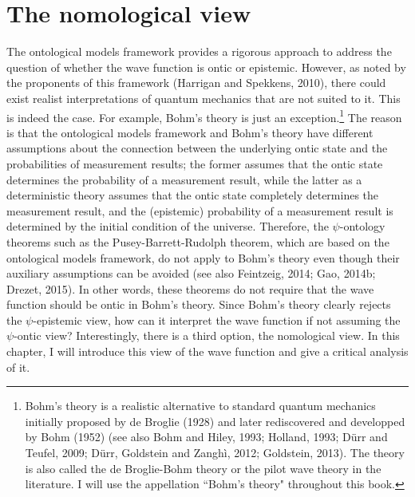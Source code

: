 \chapter{The nomological view}

The ontological models framework provides a rigorous approach to address the question of whether the wave function is ontic or epistemic. 
However, as noted by the proponents of this framework (Harrigan and Spekkens, 2010), there could exist realist interpretations of quantum mechanics that are not suited to it. This is indeed the case. For example, Bohm's theory is just an exception.\footnote{Bohm's theory is a realistic alternative to standard quantum mechanics initially proposed by de Broglie (1928) and later rediscovered and developped by Bohm (1952) (see also Bohm and Hiley, 1993; Holland, 1993; D\"{u}rr and Teufel, 2009; D\"{u}rr, Goldstein and Zangh\`{i}, 2012; Goldstein, 2013).  The theory is also called the de Broglie-Bohm theory or the pilot wave theory in the literature. I will use the appellation ``Bohm's theory" throughout this book.}
The reason is that the ontological models framework and Bohm's theory have different assumptions about the connection between the underlying ontic state and the probabilities of measurement results; the former assumes that the ontic state determines the probability of a measurement result, while the latter as a deterministic theory assumes that  the ontic state completely determines the measurement result, and  the (epistemic) probability of a measurement result is determined by the initial condition of the universe. 
Therefore, the $\psi$-ontology theorems such as the Pusey-Barrett-Rudolph theorem, which are based on the ontological models framework, do not apply to Bohm's theory even though their auxiliary assumptions can be avoided (see also Feintzeig, 2014; Gao, 2014b; Drezet, 2015). In other words, these theorems do not require that the wave function should be ontic in Bohm's theory. 
Since Bohm's theory clearly rejects the $\psi$-epistemic view, how can it interpret the wave function if not assuming the $\psi$-ontic view? Interestingly, there is a third option, the nomological view. 
In this chapter, I will introduce this view of the wave function and give a critical analysis of it.

